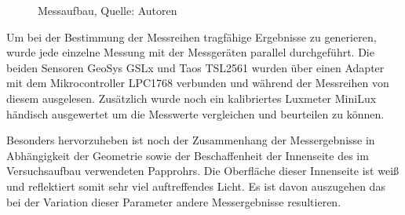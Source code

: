 \documentclass[a4paper,12pt]{scrartcl}
\begin{document}
\begin{figure}[h] 
  \caption[Messaufbau]{\label{fotohwmessaufbau}Messaufbau, Quelle: Autoren}
\end{figure} 

Um bei der Bestimmung der Messreihen tragfähige Ergebnisse zu generieren, wurde jede einzelne Messung mit der Messgeräten parallel durchgeführt. Die beiden
Sensoren GeoSys GSLx und Taos TSL2561 wurden über einen Adapter mit dem Mikrocontroller LPC1768 verbunden und während der Messreihen von diesem ausgelesen.
Zusätzlich wurde noch ein kalibriertes Luxmeter MiniLux händisch ausgewertet um die Messwerte vergleichen und beurteilen zu können. 

Besonders hervorzuheben ist noch der Zusammenhang der Messergebnisse in Abhängigkeit der Geometrie sowie der Beschaffenheit der Innenseite des im Versuchsaufbau
verwendeten Papprohrs. Die Oberfläche dieser Innenseite ist weiß und reflektiert somit sehr viel auftreffendes Licht. Es ist davon auszugehen das bei der
Variation dieser Parameter andere Messergebnisse resultieren.
\end{document}
